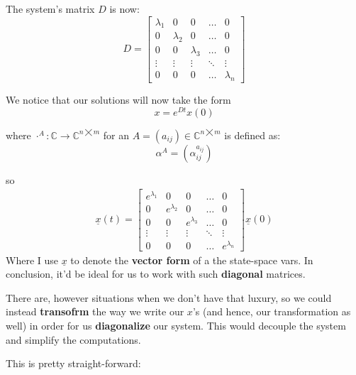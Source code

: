 The system's matrix $D$ is now:
\begin{equation*}
				D =
				\begin{bmatrix}
								\lambda_1 & 0 & 0 &\dots & 0 \\
								0 & \lambda_2 & 0 & \dots & 0 \\
								0 & 0 & \lambda_3 & \dots & 0 \\
								\vdots & \vdots & \vdots & \ddots & \vdots \\
								0 & 0 & 0 & \dots & \lambda_n
				\end{bmatrix}
\end{equation*}

We notice that our solutions will now take the form
\[
				x = e^{Dt}x(0)
\]

where $\cdot^A : \mathbb{C} \rightarrow \mathbb{C}^{n \bigtimes m}$ for an $A = (a_{ij}) \in \mathbb{C}^{n \bigtimes m}$ is defined as:
\[
				\alpha^A = (\alpha^{a_{ij}}_{ij})
\]

so
\begin{align*}
				\underline{x}(t) =
				\begin{bmatrix}
								e^{\lambda_1} & 0 & 0 &\dots & 0 \\
								0 & e^{\lambda_2} & 0 & \dots & 0 \\
								0 & 0 & e^{\lambda_3} & \dots & 0 \\
								\vdots & \vdots & \vdots & \ddots & \vdots \\
								0 & 0 & 0 & \dots & e^{\lambda_n}
				\end{bmatrix}
				\underline{x}(0)
\end{align*}
Where I use $\underline{x}$ to denote the \textbf{vector form} of a the state-space vars.
In conclusion, it'd be ideal for us to work with such \textbf{diagonal} matrices.

There are, however situations when we don't have that luxury, so we could instead \textbf{transofrm} the way we write our $x$'s (and hence, our transformation as well) in order for us \textbf{diagonalize} our system. This would decouple the system and simplify the computations.

This is pretty straight-forward:

